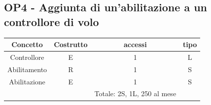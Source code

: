     \subsection*{OP4 - Aggiunta di un'abilitazione a un controllore di volo}
    \begin{table}[H]
    \centering
    \begin{tabular}{|c|c|c|c|}
    \hline
    \rowcolor{green!70!black!80}
    \textbf{Concetto} & \textbf{Costrutto} & \textbf{accessi} & \textbf{tipo}\\
    \hline
    Controllore & E & 1 & L \\
    Abilitamento & R & 1 & S \\
    Abilitazione & E & 1 & S \\
    & & Totale: 2S, 1L, 250 al mese &\\
    \hline
    \end{tabular}
    \end{table}

